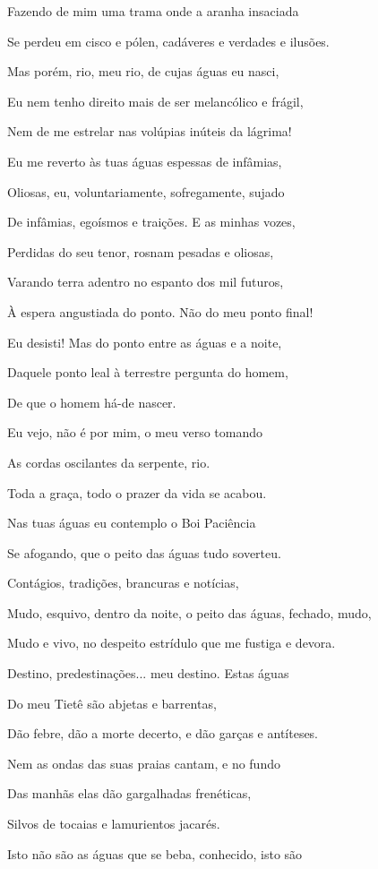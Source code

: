 Fazendo de mim uma trama onde a aranha insaciada

Se perdeu em cisco e pólen, cadáveres e verdades e ilusões.

Mas porém, rio, meu rio, de cujas águas eu nasci,

Eu nem tenho direito mais de ser melancólico e frágil,

Nem de me estrelar nas volúpias inúteis da lágrima!

Eu me reverto às tuas águas espessas de infâmias,

Oliosas, eu, voluntariamente, sofregamente, sujado

De infâmias, egoísmos e traições. E as minhas vozes,

Perdidas do seu tenor, rosnam pesadas e oliosas,

Varando terra adentro no espanto dos mil futuros,

À espera angustiada do ponto. Não do meu ponto final!

Eu desisti! Mas do ponto entre as águas e a noite,

Daquele ponto leal à terrestre pergunta do homem,

De que o homem há-de nascer.

Eu vejo, não é por mim, o meu verso tomando

As cordas oscilantes da serpente, rio.

Toda a graça, todo o prazer da vida se acabou.

Nas tuas águas eu contemplo o Boi Paciência

Se afogando, que o peito das águas tudo soverteu.

Contágios, tradições, brancuras e notícias,

Mudo, esquivo, dentro da noite, o peito das águas, fechado, mudo,

Mudo e vivo, no despeito estrídulo que me fustiga e devora.

Destino, predestinações... meu destino. Estas águas

Do meu Tietê são abjetas e barrentas,

Dão febre, dão a morte decerto, e dão garças e antíteses.

Nem as ondas das suas praias cantam, e no fundo

Das manhãs elas dão gargalhadas frenéticas,

Silvos de tocaias e lamurientos jacarés.

Isto não são as águas que se beba, conhecido, isto são

